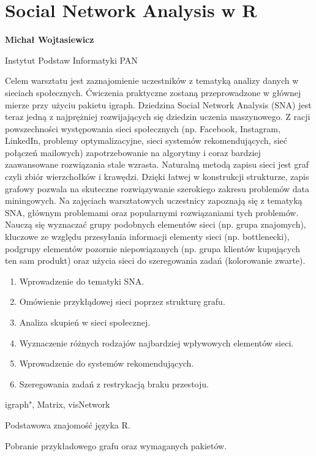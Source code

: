 \documentclass[\main/boa.tex]{subfiles}
\begin{document}
\section{Social Network Analysis w R}

\begin{minipage}{0.915\textwidth}
\centering
{\bf {} Michał Wojtasiewicz}
\end{minipage}

\vskip 0.3cm

\begin{affiliations}
\begin{minipage}{0.915\textwidth}
\centering
\large Instytut Podstaw Informatyki PAN  \\[2pt]
\end{minipage}
\end{affiliations}

\vskip 0.8cm

\opiswarsztatu Celem warsztatu jest zaznajomienie uczestników z tematyką analizy danych w sieciach społecznych. Ćwiczenia praktyczne zostaną przeprowadzone w głównej mierze przy użyciu pakietu igraph. Dziedzina Social Network Analysis (SNA) jest teraz jedną z najprężniej rozwijających się dziedzin uczenia maszynowego. Z racji powszechności występowania sieci społecznych (np. Facebook, Instagram, LinkedIn, problemy optymalizacyjne, sieci systemów rekomendujących, sieć połączeń mailowych) zapotrzebowanie na algorytmy i coraz bardziej zaawansowane rozwiązania stale wzrasta. Naturalną metodą zapisu sieci jest graf czyli zbiór wierzchołków i krawędzi. Dzięki łatwej w konstrukcji strukturze, zapis grafowy pozwala na skuteczne rozwiązywanie szerokiego zakresu problemów data miningowych. Na zajęciach warsztatowych uczestnicy zapoznają się z tematyką SNA, głównym problemami oraz popularnymi rozwiązaniami tych problemów. Nauczą się wyznaczać grupy podobnych elementów sieci (np. grupa znajomych), kluczowe ze względu przesyłania informacji elementy sieci (np. bottlenecki), podgrupy elementów pozornie niepowiązanych (np. grupa klientów kupujących ten sam produkt) oraz użycia sieci do szeregowania zadań (kolorowanie zwarte).

\planwarsztatu
\begin{enumerate}
\item Wprowadzenie do tematyki SNA.
\item Omówienie przykłądowej sieci poprzez strukturę grafu.
\item Analiza skupień w sieci społecznej.
\item Wyznaczenie różnych rodzajów najbardziej wpływowych elementów sieci.
\item Wprowadzenie do systemów rekomendujących.
\item Szeregowania zadań z restrykacją braku przestoju.
\end{enumerate}	 

\pakiety igraph", Matrix, visNetwork

\umiejetnosci Podstawowa znajomość języka R.

\wymagania Pobranie przykładowego grafu oraz wymaganych pakietów.
\end{document}
